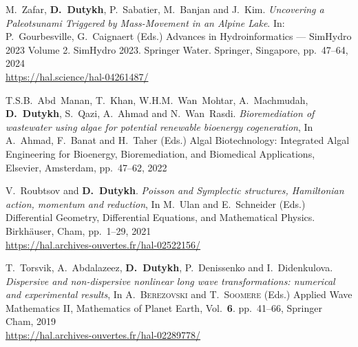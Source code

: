 \begin{etaremune}

  
  
    \item M.~Zafar, \textbf{D.~Dutykh}, P.~Sabatier, M.~Banjan and J.~Kim. \textit{Uncovering a Paleotsunami Triggered by Mass-Movement in an Alpine Lake}. In: P.~Gourbesville, G.~Caignaert (Eds.) Advances in Hydroinformatics --- SimHydro 2023 Volume 2. SimHydro 2023. Springer Water. Springer, Singapore, pp.~47--64, 2024 \\ %
    \url{https://hal.science/hal-04261487/}
  
  
    
    \item T.S.B.~Abd~Manan, T.~Khan, W.H.M.~Wan~Mohtar, A.~Machmudah, \textbf{D.~Dutykh}, S.~Qazi, A.~Ahmad and N.~Wan~Rasdi. \textit{Bioremediation of wastewater using algae for potential renewable bioenergy cogeneration}, In A.~Ahmad, F.~Banat and H.~Taher (Eds.) Algal Biotechnology: Integrated Algal Engineering for Bioenergy, Bioremediation, and Biomedical Applications, Elsevier, Amsterdam, pp.~47--62, 2022 %
  
  
    
    \item V.~Roubtsov and \textbf{D.~Dutykh}. \textit{Poisson and Symplectic structures, Hamiltonian action, momentum and reduction}, In M.~Ulan and E.~Schneider (Eds.) Differential Geometry, Differential Equations, and Mathematical Physics. Birkh\"auser, Cham, pp.~1--29, 2021 \\ %
    \url{https://hal.archives-ouvertes.fr/hal-02522156/}
  
  
  
    \item T.~Torsvik, A.~Abdalazeez, \textbf{D.~Dutykh}, P.~Denissenko and I.~Didenkulova. \textit{Dispersive and non-dispersive nonlinear long wave transformations: numerical and experimental results}, In A.~\textsc{Berezovski} and T.~\textsc{Soomere} (Eds.) Applied Wave Mathematics II, Mathematics of Planet Earth, Vol.~\textbf{6}. pp.~41--66, Springer Cham, 2019 \\ %
    \url{https://hal.archives-ouvertes.fr/hal-02289778/}
    

\end{etaremune}
